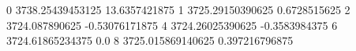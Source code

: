 0 3738.25439453125 13.6357421875
1 3725.29150390625 0.6728515625
2 3724.087890625 -0.53076171875
4 3724.26025390625 -0.3583984375
6 3724.61865234375 0.0
8 3725.015869140625 0.397216796875
